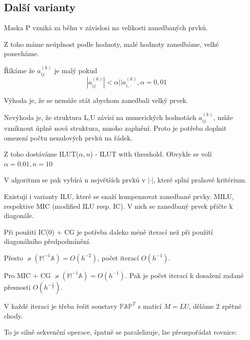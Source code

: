 \documentclass[../main.tex]{subfiles}
\begin{document}
\subsection{Další varianty}

Maska P vzniká za běhu v závislosi na velikosti zanedbaných prvků.

Z toho máme neúplnost podle hodnoty, malé hodnoty zanedbáme, velké ponecháme.

Říkáme že $a_{ij}^{(k)}$ je malý pokud \begin{equation*}
    |a_{ij}^(k)| < \alpha ||a_{i,\cdot}^{(k)}, \alpha = 0,01
\end{equation*}

Výhoda je, že se nemůže stát abychom zanedbali velký prvek. 

Nevýhoda je, že struktura L,U závisí na numerických hodnotách $a_{ij}^{(k)}$, může vzniknout úplně nová struktura, mnoho zaplnění.
Proto je potřeba doplnit omezení počtu nenulových prvků na řádek.

Z toho dostáváme ILUT($\alpha, n$) - ILUT with threshold. Obvykle se volí $\alpha = 0.01, n=10$

V algoritmu se pak vybírá n největších prvků  v $|\cdot|$, které splní prahové kritérium.


\begin{remark}
    Existují i varianty ILU, které se snaží kompenzovat zanedbané prvky. MILU, respektive MIC (modified ILU resp. IC).
    V nich se zanedbaný prvek přičte k diagonále.
\end{remark}

\begin{remark}
    Při použití IC(0) + CG je potřeba daleko méně iterací než při použití diagonálního předpodmínění.

    Přesto $\varkappa(\mathbb{M}^{-1} \mathbb{A}) = O(h^{-2})$, počet iterací $O(h^{-1})$.

    Pro MIC + CG $\varkappa(\mathbb{M}^{-1} \mathbb{A}) = O(h^{-1})$. Pak je počet iterací k dosažení zadané přesnosti  $O(h^{-\frac{1}{2}})$.
\end{remark}

\begin{remark}
    V každé iteraci je třeba řešit soustavy $\mathbb{P} \mathbb{A} \mathbb{P}^T$ s maticí $M = LU$, děláme 2 zpětné chody.

    To je silně sekvenční operace, špatně se paralelizuje, lze přeuspořádat rovnice:



\end{remark}
\end{document}

